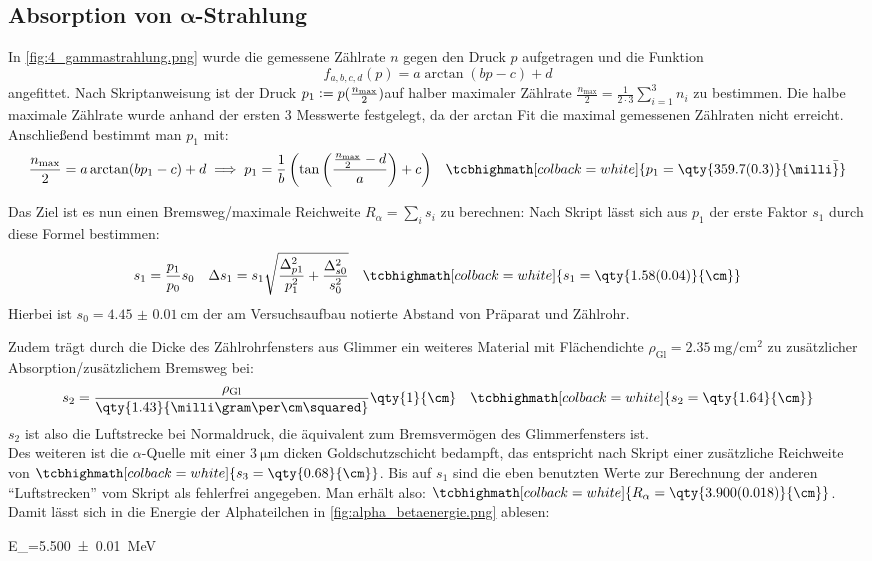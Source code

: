 \subsection[Absorption von Alphastrahlung]{Absorption von \(\boldsymbol{\alpha}\)-Strahlung}
In \cref{fig:4_gammastrahlung.png} wurde die gemessene Zählrate \(n\) gegen den Druck \(p\) aufgetragen und die Funktion
\begin{equation}
    f_{a,b,c,d}(p)=a\arctan(bp-c)+d    
\end{equation}
angefittet. Nach Skriptanweisung ist der Druck \(p_1\vcentcolon= p(\frac{n_\text{max}}{2})\)auf halber maximaler Zählrate \(\frac{n_\text{max}}{2}=\frac{1}{2\cdot3}\sum_{i=1}^3 n_i\) zu bestimmen. Die halbe maximale Zählrate wurde anhand der ersten 3 Messwerte festgelegt, da der arctan Fit die maximal gemessenen Zählraten nicht erreicht. Anschließend bestimmt man \(p_1\) mit:
\begin{align}
    \frac{n_\text{max}}{2}=a\arctan(bp_1-c)+d\implies p_1=\frac{1}{b}\left(\tan\left(\frac{\frac{n_\text{max}}{2}-d}{a}\right)+c\right)&&\tcbhighmath[colback=white]{p_1=\qty{359.7(0.3)}{\milli\bar}}
\end{align} 

Das Ziel ist es nun einen Bremsweg/maximale Reichweite \(R_\alpha=\sum_i s_i\) zu berechnen: Nach Skript lässt sich aus \(p_1\) der erste Faktor \(s_1\) durch diese Formel bestimmen:
\begin{align}
    s_1=\frac{p_1}{p_0}s_0&&\Delta s_1=s_1\sqrt{\frac{\Delta_{p 1}^{2}}{p_{1}^{2}} + \frac{\Delta_{s 0}^{2}}{s_{0}^{2}}}
    &&\tcbhighmath[colback=white]{s_1=\qty{1.58(0.04)}{\cm}}
\end{align}
Hierbei ist \(s_0=\qty{4.45(1)}{\cm}\) der am Versuchsaufbau notierte Abstand von Präparat und Zählrohr.

Zudem trägt durch die Dicke des Zählrohrfensters aus Glimmer ein weiteres Material mit Flächendichte \(\rho_\text{Gl}=\qty{2.35}{\milli\gram\per\cm\squared}\) zu zusätzlicher Absorption/zusätzlichem Bremsweg bei:
\begin{align}
    s_2=\frac{\rho_\text{Gl}}{\qty{1.43}{\milli\gram\per\cm\squared}}\qty{1}{\cm}&&\tcbhighmath[colback=white]{s_2=\qty{1.64}{\cm}}
\end{align}
\(s_2\) ist also die Luftstrecke bei Normaldruck, die äquivalent zum Bremsvermögen des Glimmerfensters ist.\\
Des weiteren ist die \(\alpha\)-Quelle  mit einer \(\qty{3}{\micro\m}\) dicken Goldschutzschicht bedampft, das entspricht nach Skript einer zusätzliche Reichweite von \(\tcbhighmath[colback=white]{s_3=\qty{0.68}{\cm}}\). Bis auf \(s_1\) sind die eben benutzten Werte zur Berechnung der anderen \enquote{Luftstrecken} vom Skript als fehlerfrei angegeben. Man erhält also: \(\tcbhighmath[colback=white]{R_{\alpha}=\qty{3.900(0.018)}{\cm}}\). Damit lässt sich in die Energie der Alphateilchen in \cref{fig:alpha_betaenergie.png} ablesen:
\begin{rb}
    E_\alpha=\qty{5.500(10)}{\mega\electronvolt}
\end{rb}


